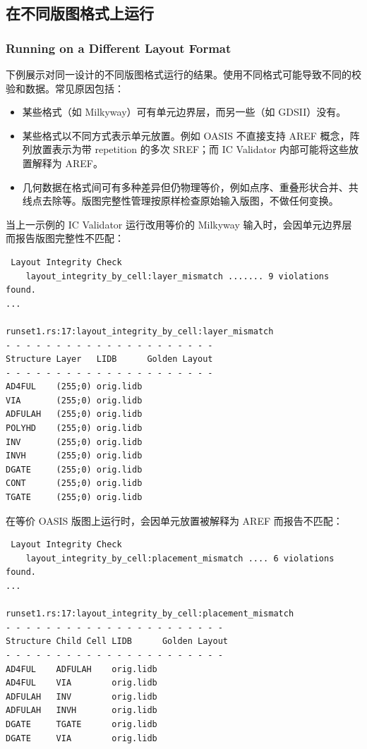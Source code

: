 \subsection{在不同版图格式上运行}
\subsubsection*{Running on a Different Layout Format}

下例展示对同一设计的不同版图格式运行的结果。使用不同格式可能导致不同的校验和数据。常见原因包括：
\begin{itemize}
  \item 某些格式（如 Milkyway）可有单元边界层，而另一些（如 GDSII）没有。
  \item 某些格式以不同方式表示单元放置。例如 OASIS 不直接支持 AREF 概念，阵列放置表示为带 repetition 的多次 SREF；而 IC Validator 内部可能将这些放置解释为 AREF。
  \item 几何数据在格式间可有多种差异但仍物理等价，例如点序、重叠形状合并、共线点去除等。版图完整性管理按原样检查原始输入版图，不做任何变换。
\end{itemize}

当上一示例的 IC Validator 运行改用等价的 Milkyway 输入时，会因单元边界层而报告版图完整性不匹配：

\begin{lstlisting}
 Layout Integrity Check
    layout_integrity_by_cell:layer_mismatch ....... 9 violations found.
...

runset1.rs:17:layout_integrity_by_cell:layer_mismatch
- - - - - - - - - - - - - - - - - - - - -
Structure Layer   LIDB      Golden Layout
- - - - - - - - - - - - - - - - - - - - -
AD4FUL    (255;0) orig.lidb
VIA       (255;0) orig.lidb
ADFULAH   (255;0) orig.lidb
POLYHD    (255;0) orig.lidb
INV       (255;0) orig.lidb
INVH      (255;0) orig.lidb
DGATE     (255;0) orig.lidb
CONT      (255;0) orig.lidb
TGATE     (255;0) orig.lidb
\end{lstlisting}

在等价 OASIS 版图上运行时，会因单元放置被解释为 AREF 而报告不匹配：

\begin{lstlisting}
 Layout Integrity Check
    layout_integrity_by_cell:placement_mismatch .... 6 violations found.
...

runset1.rs:17:layout_integrity_by_cell:placement_mismatch
- - - - - - - - - - - - - - - - - - - - - -
Structure Child Cell LIDB      Golden Layout
- - - - - - - - - - - - - - - - - - - - - -
AD4FUL    ADFULAH    orig.lidb
AD4FUL    VIA        orig.lidb
ADFULAH   INV        orig.lidb
ADFULAH   INVH       orig.lidb
DGATE     TGATE      orig.lidb
DGATE     VIA        orig.lidb
\end{lstlisting}

